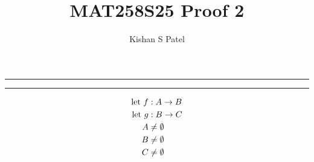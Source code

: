 \documentclass{exam}
\theoremstyle{plain}
\theoremstyle{definition}
\begin{document}
\title{MAT258S25 Proof 2}
\author{Kishan S Patel}
\maketitle

\renewcommand{\qedsymbol}{QED}

\noindent\rule{\textwidth}{1pt}


\noindent\rule{\textwidth}{1pt}

\begin{align*}
	{\text{let } } f & : A \to B      \\
	{\text{let } } g & : B \to C      \\
	A       & \neq \emptyset \\
	B       & \neq \emptyset \\
	C       & \neq \emptyset
\end{align*}

\begin{questions}
	
	
\end{questions}
\end{document}
